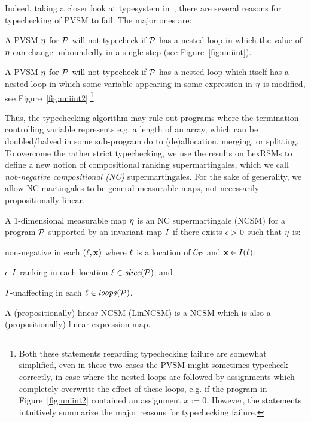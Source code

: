 Indeed, taking a closer look at typesystem in~\cite{HolgerPOPL}, there are several reasons for typechecking of PVSM to fail. The major ones are:
\begin{compactenum}
\item
A PVSM $\eta$ for \PP{} $\mathcal{P}$ will not typecheck if $\mathcal{P}$ has a 
nested loop in which the value of $\eta$ can change unboundedly in a single 
step (see Figure~\ref{fig:uniint}). 
\item
A PVSM $\eta$ for  \PP{} $\mathcal{P}$ will not typecheck if $\mathcal{P}$ has a 
nested loop which itself has a nested loop in which some variable appearing in 
some expression in $\eta$ is modified, see 
Figure~\ref{fig:uniint2}.\footnote{Both these statements regarding typechecking 
failure are somewhat simplified, even in these two cases the PVSM might 
sometimes typecheck correctly, in case where the nested loops are followed by 
assignments which completely overwrite the effect of these loops, e.g. if 
the program in Figure~\ref{fig:uniint2} contained an assignment $x:=0$. 
However, the statements intuitively 
summarize the major reasons for typechecking failure. }
\end{compactenum}



Thus, the typechecking algorithm may rule out programs where the termination-controlling variable represents e.g. a length of an array, which can be doubled/halved in some sub-program do to (de)allocation, merging, or splitting.
To overcome the rather strict typechecking, we use the results on LexRSMs to define a new notion of compositional ranking supermartingales, which we call \emph{nob-negative compositional (NC)} supermartingales. For the sake of generality, we allow NC martingales to be general measurable maps, not necessarily propositionally linear.

\begin{definition}
\label{def:nonneg-comp}
A 1-dimensional measurable map $\eta$ is an NC supermartingale (NCSM) for a program $\mathcal{P}$ supported by an invariant map $I$ if there exists $\epsilon>0$ such that $\eta$ is:
\begin{compactenum}
\item  non-negative in each $(\ell,\mathbf{x})$ where $\ell$ is a location of $\mathcal{C}_{\mathcal{P}}$ and $\mathbf{x}\in I(\ell)$;
\item 
 $\epsilon$-$I$-ranking in each location $\ell\in\mathit{slice}{(\mathcal{P})}$; and
\item 
  $I$-unaffecting in each $\ell\in\mathit{loops}(\mathcal{P})$.
\end{compactenum}
A (propositionally) linear NCSM (LinNCSM) is a NCSM which is also a (propositionally) linear expression map.
\end{definition}



